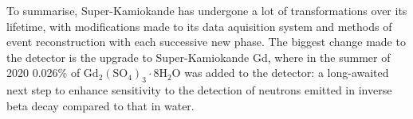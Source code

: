 To summarise, Super-Kamiokande has undergone a lot of transformations over its lifetime, with modifications made to its data aquisition system and methods of event reconstruction with each successive new phase. The biggest change made to the detector is the upgrade to Super-Kamiokande Gd, where in the summer of 2020 0.026\% of $\mathrm{Gd}_{2}\left(\mathrm{SO}_{4}\right)_{3} \cdot 8 \mathrm{H}_{2} \mathrm{O}$ was added to the detector: a long-awaited next step to enhance sensitivity to the detection of neutrons emitted in inverse beta decay compared to that in water.

















